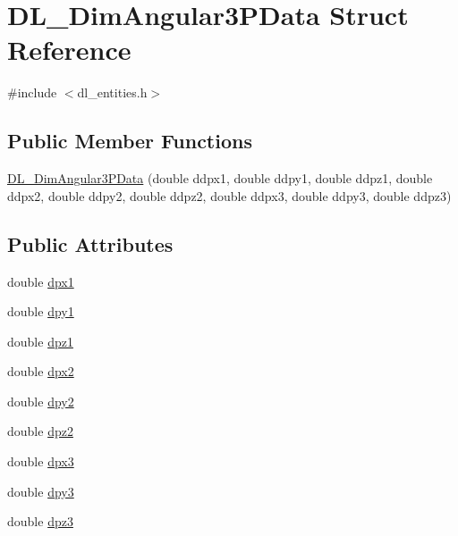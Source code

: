 \hypertarget{structDL__DimAngular3PData}{\section{D\-L\-\_\-\-Dim\-Angular3\-P\-Data Struct Reference}
\label{structDL__DimAngular3PData}
}


{\ttfamily \#include $<$dl\-\_\-entities.\-h$>$}

\subsection*{Public Member Functions}
\begin{DoxyCompactItemize}
\item 
\hyperlink{structDL__DimAngular3PData_ac172063cdeeaa37648b03b0e67963549}{D\-L\-\_\-\-Dim\-Angular3\-P\-Data} (double ddpx1, double ddpy1, double ddpz1, double ddpx2, double ddpy2, double ddpz2, double ddpx3, double ddpy3, double ddpz3)
\end{DoxyCompactItemize}
\subsection*{Public Attributes}
\begin{DoxyCompactItemize}
\item 
double \hyperlink{structDL__DimAngular3PData_adbc06ec7f4f04281abe01a7f133d690a}{dpx1}
\item 
double \hyperlink{structDL__DimAngular3PData_a5c2773d2f916195d040686ec5a89197c}{dpy1}
\item 
double \hyperlink{structDL__DimAngular3PData_a0f026aac573573827e38f0a09c63c1e6}{dpz1}
\item 
double \hyperlink{structDL__DimAngular3PData_aa166b2aded5c79b128a4124aaa7a0e92}{dpx2}
\item 
double \hyperlink{structDL__DimAngular3PData_aa1b75635b26400b43fb13ca39ca317e9}{dpy2}
\item 
double \hyperlink{structDL__DimAngular3PData_a738a84bbf441846b6637fe614cf8ea55}{dpz2}
\item 
double \hyperlink{structDL__DimAngular3PData_a3ef443d5fd3adf79af50e34a9a19a0a4}{dpx3}
\item 
double \hyperlink{structDL__DimAngular3PData_a4d2131d3149e6024da869ff141479255}{dpy3}
\item 
double \hyperlink{structDL__DimAngular3PData_a934dc7d6446107520dc805571f94b4be}{dpz3}
\end{DoxyCompactItemize}


